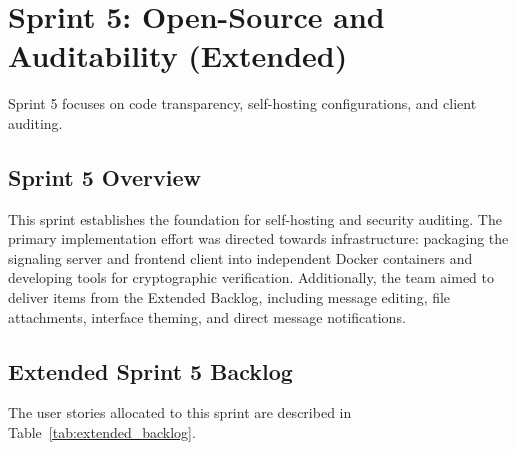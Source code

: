 \section{Sprint 5: Open-Source and Auditability (Extended)}
Sprint 5 focuses on code transparency, self-hosting configurations, and client auditing.

\subsection{Sprint 5 Overview}
This sprint establishes the foundation for self-hosting and security auditing. The primary implementation effort was directed towards infrastructure: packaging the signaling server and frontend client into independent Docker containers and developing tools for cryptographic verification. Additionally, the team aimed to deliver items from the Extended Backlog, including message editing, file attachments, interface theming, and direct message notifications.

\subsection{Extended Sprint 5 Backlog}
The user stories allocated to this sprint are described in Table~\ref{tab:extended_backlog}.

